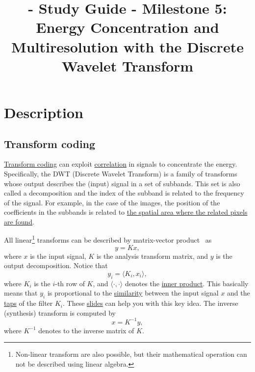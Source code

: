 
\title{\SM{} - Study Guide - Milestone 5: Energy Concentration and Multiresolution  with the Discrete Wavelet Transform}

\maketitle

\section{Description}

\subsection{Transform coding}

\href{https://web.stanford.edu/class/ee398a/handouts/lectures/07-TransformCoding.pdf}{Transform
  coding} can exploit
\href{https://en.wikipedia.org/wiki/Correlation_and_dependence}{correlation}
in signals to concentrate the energy. Specifically, the DWT (Discrete
Wavelet Transform) is a family of transforms whose output describes
the (input) signal in a set of subbands. This set is also called a
decomposition and the index of the subband is related to the frequency
of the signal. For example, in the case of the images, the position of
the coefficients in the subbands is related to
\href{https://en.wikipedia.org/wiki/Discrete_wavelet_transform#/media/File:Jpeg2000_2-level_wavelet_transform-lichtenstein.png}{the
  spatial area where the related pixels are found}.

All linear\footnote{Non-linear transform are also possible, but their
  mathematical operation can not be described using linear algebra.}
transforms can be described by matrix-vector
product~\cite{strang4linear} as
\begin{equation}
  y = Kx,
  \label{eq:forward_transform_matrix_form}
\end{equation}
where $x$ is the input signal, $K$ is the analysis transform matrix,
and $y$ is the output decomposition. Notice that
\begin{equation}
  y_i = \langle K_i, x_i\rangle,
\end{equation}
where $K_i$ is the $i$-th row of $K$, and $\langle\cdot,\cdot\rangle$
denotes the
\href{https://mathworld.wolfram.com/InnerProduct.html}{inner
  product}. This basically means that $y_i$ is proportional to the
\href{https://en.wikipedia.org/wiki/Similarity_(geometry)}{similarity}
between the input signal $x$ and the
\href{https://en.wikipedia.org/wiki/Finite_impulse_response}{taps} of
the filter $K_i$. These
\href{https://cseweb.ucsd.edu/classes/fa17/cse166-a/lec13.pdf}{slides}
can help you with this key idea. The inverse (synthesis) transform is
computed by
\begin{equation}
  x = K^{-1}y,
  \label{eq:backward_transform_matrix_form}
\end{equation}
where $K^{-1}$ denotes to the inverse matrix of $K$.


